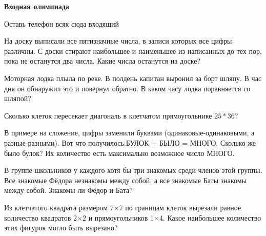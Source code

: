 \centerline{\bf \Huge Входная олимпиада}


\begin{flushright}
        \scriptsize{Оставь телефон всяк сюда входящий}
\end{flushright}


  На доску выписали все пятизначные числа, в записи которых все цифры различны. С доски стирают наибольшее и наименьшее из написанных до тех пор, пока не останутся два числа. Какие числа останутся на доске?

 Моторная лодка плыла по реке. В полдень капитан выронил за борт шляпу. В час дня он 
обнаружил это и повернул обратно. В каком часу лодка поравняется со шляпой?

 Сколько клеток пересекает диагональ в клетчатом прямоугольнике $25 * 36$?

 В примере на сложение, цифры заменили буквами (одинаковые-одинаковыми, а разные-разными). 
Вот что получилось:БУЛОК + БЫЛО = МНОГО. Сколько же было булок? Их количество есть максимально возможное число МНОГО. 

 В группе школьников у каждого хотя бы три знакомых среди членов этой группы. Все знакомые Фёдора незнакомы между собой, а все знакомые Баты знакомы между собой. Знакомы ли Фёдор и Бата?

 Из клетчатого квадрата размером 7×7 по границам клеток вырезали равное количество квадратов 2×2 и прямоугольников 1×4. Какое наибольшее количество этих фигурок могло быть вырезано?
